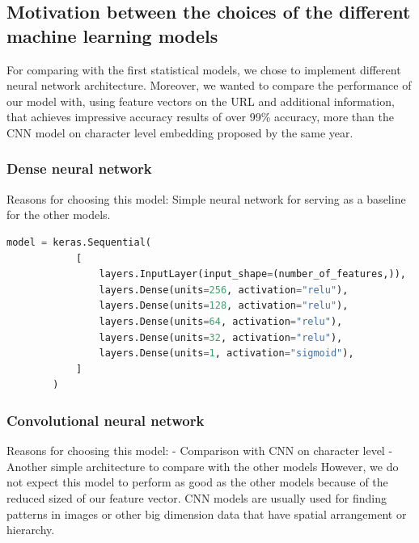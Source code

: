 \documentclass{article}
\begin{document}
    \subsection{Motivation between the choices of the different machine learning models}\label{subsec:motivation-between-the-choices-of-the-different-machine-learning-models}
    For comparing with the first statistical models, we chose to implement different neural network architecture.
    Moreover, we wanted to compare the performance of our model with\cite{EfficientDeepLearningPhishingDetection}, using feature vectors on the URL and additional information, that achieves impressive accuracy results of over 99\% accuracy, more than the CNN model on character level embedding proposed by\cite{CharacterLevelCNN} the same year.

    \subsubsection{Dense neural network}
    Reasons for choosing this model:
    Simple neural network for serving as a baseline for the other models.

    \begin{lstlisting}[language=Python, caption=DNN on feature vector architecture]
        model = keras.Sequential(
            [
                layers.InputLayer(input_shape=(number_of_features,)),
                layers.Dense(units=256, activation="relu"),
                layers.Dense(units=128, activation="relu"),
                layers.Dense(units=64, activation="relu"),
                layers.Dense(units=32, activation="relu"),
                layers.Dense(units=1, activation="sigmoid"),
            ]
        )
    \end{lstlisting}

    \subsubsection{Convolutional neural network}
    Reasons for choosing this model:
    - Comparison with CNN on character level
    - Another simple architecture to compare with the other models
    However, we do not expect this model to perform as good as the other models because of the reduced sized of our feature vector.
    CNN models are usually used for finding patterns in images or other big dimension data that have spatial arrangement or hierarchy.
\end{document}
